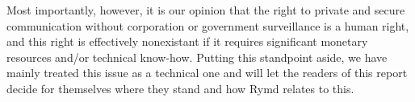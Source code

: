 Most importantly, however, it is our opinion that the right to private and secure communication without corporation or government surveillance is a human right, and this right is effectively nonexistant if it requires significant monetary resources and/or technical know-how. Putting this standpoint aside, we have mainly treated this issue as a technical one and will let the readers of this report decide for themselves where they stand and how Rymd relates to this.
